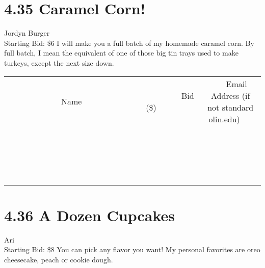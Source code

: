 \documentclass[11pt]{article}
\begin{document}
\section*{4.35 Caramel Corn!}
Jordyn Burger
\\
Starting Bid: \$6
\newline
I will make you a full batch of my homemade caramel corn. By full batch, I mean the equivalent of one of those big tin trays used to make turkeys, except the next size down.
\\[3ex]
\begin{tabular}{c c c}
~~~~~~~~~~~~~Name~~~~~~~~~~~~~ & ~~~~~~~~~Bid (\$)~~~~~~~~~  & ~~~Email Address (if not standard olin.edu)~~~\\
 & & \\
\hline
 & & \\
\hline
 & & \\
\hline
 & & \\
\hline
 & & \\
\hline
 & & \\
\hline
 & & \\
\hline
 & & \\
\hline
 & & \\
\hline
 & & \\
\hline
 & & \\
\hline
 & & \\
\hline
 & & \\
\hline
 & & \\
\hline
 & & \\
\hline
 & & \\
\hline
 & & \\
\hline
 & & \\
\hline
 & & \\
\hline
\end{tabular}
\newpage
\section*{4.36 A Dozen Cupcakes}
Ari
\\
Starting Bid: \$8
\newline
You can pick any flavor you want! My personal favorites are oreo cheesecake, peach or cookie dough.
\end{document}
